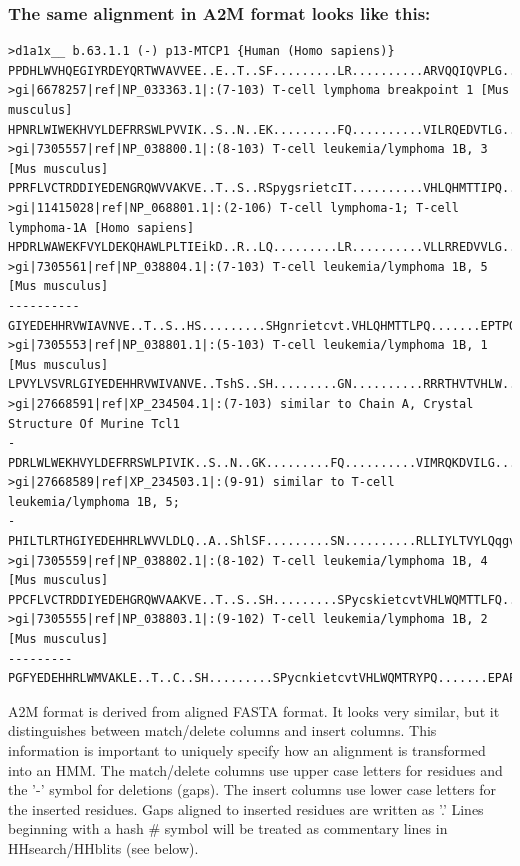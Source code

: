 \documentclass[11pt,a4paper]{article}
\begin{document}
\subsubsection*{The same alignment in A2M format looks like this:}

\scriptsize\begin{verbatim}
>d1a1x__ b.63.1.1 (-) p13-MTCP1 {Human (Homo sapiens)}
PPDHLWVHQEGIYRDEYQRTWVAVVEE..E..T..SF.........LR..........ARVQQIQVPLG.......DAARPSHLLTS.....QL
>gi|6678257|ref|NP_033363.1|:(7-103) T-cell lymphoma breakpoint 1 [Mus musculus]
HPNRLWIWEKHVYLDEFRRSWLPVVIK..S..N..EK.........FQ..........VILRQEDVTLG.......EAMSPSQLVPY.....EL
>gi|7305557|ref|NP_038800.1|:(8-103) T-cell leukemia/lymphoma 1B, 3 [Mus musculus]
PPRFLVCTRDDIYEDENGRQWVVAKVE..T..S..RSpygsrietcIT..........VHLQHMTTIPQ.......EPTPQQPINNN.....SL
>gi|11415028|ref|NP_068801.1|:(2-106) T-cell lymphoma-1; T-cell lymphoma-1A [Homo sapiens]
HPDRLWAWEKFVYLDEKQHAWLPLTIEikD..R..LQ.........LR..........VLLRREDVVLG.......RPMTPTQIGPS.....LL
>gi|7305561|ref|NP_038804.1|:(7-103) T-cell leukemia/lymphoma 1B, 5 [Mus musculus]
----------GIYEDEHHRVWIAVNVE..T..S..HS.........SHgnrietcvt.VHLQHMTTLPQ.......EPTPQQPINNN.....SL
>gi|7305553|ref|NP_038801.1|:(5-103) T-cell leukemia/lymphoma 1B, 1 [Mus musculus]
LPVYLVSVRLGIYEDEHHRVWIVANVE..TshS..SH.........GN..........RRRTHVTVHLW.......KLIPQQVIPFNplnydFL
>gi|27668591|ref|XP_234504.1|:(7-103) similar to Chain A, Crystal Structure Of Murine Tcl1
-PDRLWLWEKHVYLDEFRRSWLPIVIK..S..N..GK.........FQ..........VIMRQKDVILG.......DSMTPSQLVPY.....EL
>gi|27668589|ref|XP_234503.1|:(9-91) similar to T-cell leukemia/lymphoma 1B, 5;
-PHILTLRTHGIYEDEHHRLWVVLDLQ..A..ShlSF.........SN..........RLLIYLTVYLQqgvafplESTPPSPMNLN.....GL
>gi|7305559|ref|NP_038802.1|:(8-102) T-cell leukemia/lymphoma 1B, 4 [Mus musculus] 
PPCFLVCTRDDIYEDEHGRQWVAAKVE..T..S..SH.........SPycskietcvtVHLWQMTTLFQ.......EPSPDSLKTFN.....FL
>gi|7305555|ref|NP_038803.1|:(9-102) T-cell leukemia/lymphoma 1B, 2 [Mus musculus]
---------PGFYEDEHHRLWMVAKLE..T..C..SH.........SPycnkietcvtVHLWQMTRYPQ.......EPAPYNPMNYN.....FL
\end{verbatim}\normalsize

A2M format is derived from aligned FASTA format. It looks very similar, but it 
distinguishes between match/delete columns and insert columns. This information is 
important to uniquely specify how an alignment is transformed into an HMM. The 
match/delete columns use upper case letters for residues and the '-' symbol for 
deletions (gaps). The insert columns use lower case letters for the inserted residues. 
Gaps aligned to inserted residues are written as '.' Lines beginning with a hash \# 
symbol will be treated as commentary lines in HHsearch/HHblits (see below).
\end{document}
